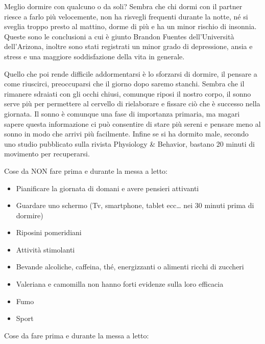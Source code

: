 \documentclass[12pt]{book} %
\begin{document}
\begin{mdframed}[linewidth=1pt]
Meglio dormire con qualcuno o da soli? Sembra che chi dormi con
il partner riesce a farlo più velocemente, non ha risvegli frequenti durante la notte, né si sveglia troppo presto al
mattino, dorme di più e ha un minor rischio di insonnia. Queste sono le conclusioni a cui è giunto Brandon Fuentes
dell'Università dell'Arizona, inoltre sono stati registrati un minor grado di depressione, ansia e stress e una
maggiore soddisfazione della vita in generale. 

Quello che poi rende difficile addormentarsi è lo sforzarsi di dormire, il pensare a come riuscirci, preoccuparsi che il giorno dopo saremo stanchi. Sembra che il rimanere sdraiati con gli occhi chiusi, comunque riposi il nostro corpo, il sonno serve più per permettere al cervello di rielaborare e fissare ciò che è successo nella giornata. Il sonno è comunque una fase di importanza primaria, ma magari sapere questa informazione ci può consentire di stare più sereni e pensare meno al sonno in modo che arrivi più facilmente. 
Infine se si ha dormito male, secondo uno studio pubblicato sulla rivista Physiology \& Behavior, bastano 20 minuti di movimento per recuperarsi.

Cose da NON fare prima e durante la messa a letto:

\begin{itemize}
\item Pianificare la giornata di domani e avere pensieri attivanti
\item Guardare uno schermo (Tv, smartphone, tablet ecc… nei 30 minuti prima di dormire)
\item Riposini pomeridiani
\item Attività stimolanti
\item Bevande alcoliche, caffeina, thé, energizzanti o alimenti ricchi di zuccheri
\item Valeriana e camomilla non hanno forti evidenze sulla loro efficacia
\item Fumo
\item Sport
\end{itemize}

Cose da fare prima e durante la messa a letto:


\end{mdframed}
\end{document}
